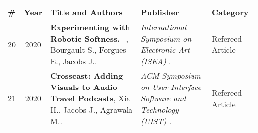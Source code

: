 
\begin{longtable}{lcp{7.75cm}>{\raggedright}p{5.25cm}p{1.75cm}}
\# & Year & Title and Authors & Publisher & Category\\
\hline 
\endhead 
    20 & 2020 & {\bf Experimenting with Robotic Softness.  }, Bourgault S., Forgues E., Jacobs J..  & \emph{ International Symposium on Electronic Art (ISEA) } .   & Refereed Article\\
    21 & 2020 & {\bf Crosscast: Adding Visuals to Audio Travel Podcasts}, Xia H., Jacobs J., Agrawala M..  & \emph{ ACM Symposium on User Interface Software and Technology (UIST) } .   & Refereed Article\\
\end{longtable}
